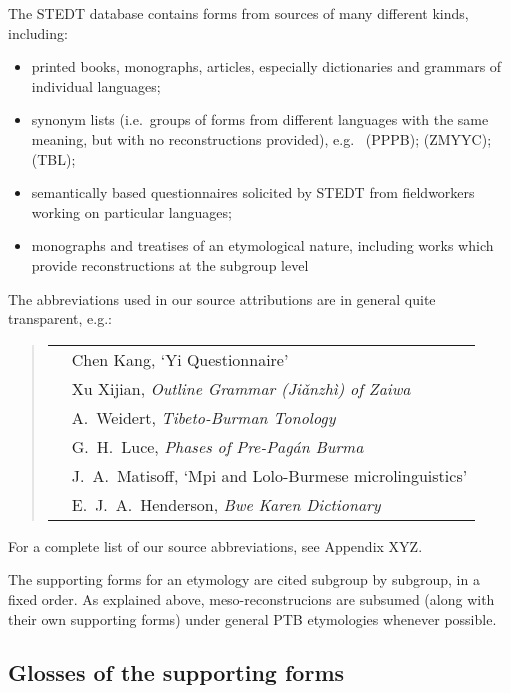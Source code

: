 The STEDT database contains forms from sources of many different kinds,
including:
\begin{itemize}
\item printed books, monographs, articles, especially dictionaries and grammars of
individual languages;
\item synonym lists (i.e.\ groups of forms from different languages with the same
meaning, but with no reconstructions provided), e.g.\ \citealt{GHL-PPB} (PPPB);
 \citealt{ZMYYC} (ZMYYC); \citealt{TBL} (TBL);
\item semantically based questionnaires solicited by STEDT from fieldworkers working
on particular languages;
\item monographs and treatises of an etymological nature, including works which
provide reconstructions at the subgroup level
\end{itemize}

The abbreviations used in our source attributions are in general quite
transparent, e.g.:

\begin{quote}
\begin{tabular}{ll}
\citealt{CK-YiQ}	&Chen Kang, ‘Yi Questionnaire’\\
\citealt{JZ-Zaiwa}	&Xu Xijian, \textit{Outline Grammar (Jiǎnzhì) of Zaiwa}\\
\citealt{AW-TBT}	&A.~Weidert, \textit{Tibeto-Burman Tonology}\\
\citealt{GHL-PPB}	&G.~H.~Luce, \textit{Phases of Pre-Pag\'an Burma}\\
\citealt{JAM-MLBM}	&J.~A.~Matisoff, ‘Mpi and Lolo-Burmese microlinguistics’\\
\citealt{EJAH-BKD}	&E.~J.~A.~Henderson, \textit{Bwe Karen Dictionary}\\
\end{tabular}
\end{quote}

For a complete list of our source abbreviations, see Appendix XYZ.

The supporting forms for an etymology are cited subgroup by subgroup, in a fixed order. As explained above, meso-reconstrucions are subsumed (along with their own supporting forms) under general PTB etymologies whenever possible.

\subsection{Glosses of the supporting forms}

